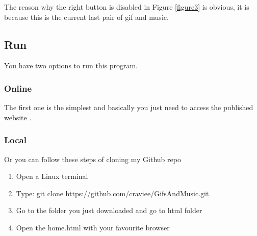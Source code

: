 The reason why the right button is disabled in Figure \ref{figure3} is obvious, it is because this is the current last pair of gif and music.

\subsection{Run}

You have two options to run this program.

\subsubsection{Online}
The first one is the simplest and basically you just need to access the published website \cite{heroku}.

\subsubsection{Local}
Or you can follow these steps of cloning my Github repo \cite{craviee}
\begin{enumerate}

	\item Open a Linux terminal
	
	\item Type: git clone https://github.com/craviee/GifsAndMusic.git
	
	\item Go to the folder you just downloaded and go to html folder
	
	\item Open the home.html with your favourite browser
	
\end{enumerate}







